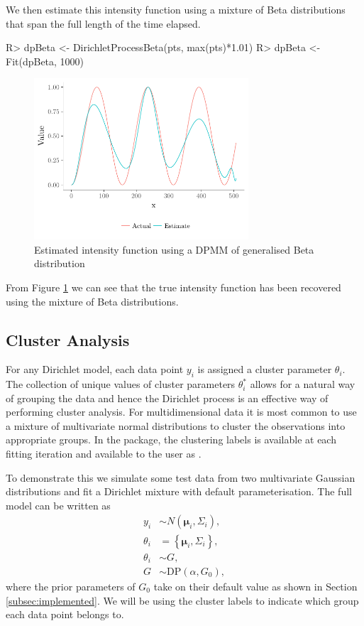 \documentclass[nojss]{jss}
\begin{document}
We then estimate this intensity function using a mixture of Beta distributions that span the full length of the time elapsed.

\begin{Schunk}
\begin{Sinput}
R> dpBeta <- DirichletProcessBeta(pts, max(pts)*1.01)
R> dpBeta <- Fit(dpBeta, 1000)
\end{Sinput}
\end{Schunk}

\begin{figure}[tb]
\centering
	\includegraphics[height=60mm, width=80mm]{img/poisson_intensity_plot.pdf}
\caption{Estimated intensity function using a DPMM of generalised Beta distribution}
\label{fig:poissonintensity}
\end{figure}
From Figure \ref{fig:poissonintensity} we can see that the true intensity function has been recovered using the mixture of Beta distributions.

\subsection{Cluster Analysis}
For any Dirichlet model, each data point $y_i$ is assigned a cluster parameter $\theta _i$. The collection of unique values of cluster parameters $\theta _i ^*$ allows for a natural way of grouping the data and hence the Dirichlet process is an effective way of performing cluster analysis. For multidimensional data it is most common to use a mixture of multivariate normal distributions to cluster the observations into appropriate groups. In the  package, the clustering labels is available at each fitting iteration and available to the user as .

To demonstrate this we simulate some test data from two multivariate Gaussian distributions and fit a Dirichlet mixture with default parameterisation. The full model can be written as
\begin{align*}
y _i & \sim N (\boldsymbol{\mu}_i, \Sigma _i ), \\
\theta_i & =  \left\lbrace \boldsymbol{\mu}_i, \Sigma _i \right\rbrace , \\
\theta _i & \sim G, \\
G & \sim \text{DP} ( \alpha, G_0 ),
\end{align*}
where the prior parameters of $G_0$ take on their default value as shown in Section \ref{subsec:implemented}. We will be using the cluster labels to indicate which group each data point belongs to.
\end{document}

